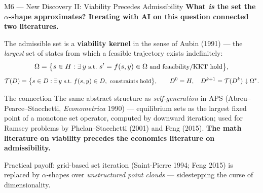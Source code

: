 \documentclass[10pt,aspectratio=169]{beamer}
\begin{document}
\begin{frame}{M6 --- New Discovery II: Viability Precedes Admissibility}
\textbf{What \emph{is} the set the $\alpha$-shape approximates? Iterating with AI on this question connected two literatures.}

\smallskip
{\small The admissible set is a \textbf{viability kernel} in the sense of Aubin (1991) --- the
\emph{largest} set of states from which a feasible trajectory exists indefinitely:}
\vspace{-0.1cm}
\[
\small
\Omega = \big\{ s \in H : \exists\, y \ \text{s.t.}\ s' = f(s,y) \in \Omega \ \text{and feasibility/KKT hold} \big\},
\]
\vspace{-0.55cm}
\[
\small
\mathcal{T}(D) = \big\{ s \in D : \exists\, y \ \text{s.t.}\ f(s,y) \in D,\ \text{constraints hold} \big\},
\qquad D^0 = H,\quad D^{k+1} = \mathcal{T}(D^k) \downarrow \Omega^{*}.
\]

\smallskip
\begin{block}{The connection}
\small The same abstract structure as \emph{self-generation} in
APS (Abreu--Pearce--Stacchetti, \emph{Econometrica} 1990) --- equilibrium sets as the largest
fixed point of a monotone set operator, computed by downward iteration; used for Ramsey problems
by Phelan--Stacchetti (2001) and Feng (2015). \textbf{The math literature on viability
precedes the economics literature on admissibility.}
\end{block}

\smallskip
{\small Practical payoff: grid-based set iteration (Saint-Pierre 1994; Feng 2015) is replaced by
$\alpha$-shapes over \emph{unstructured point clouds} --- sidestepping the curse of dimensionality.}
\end{frame}
\end{document}
